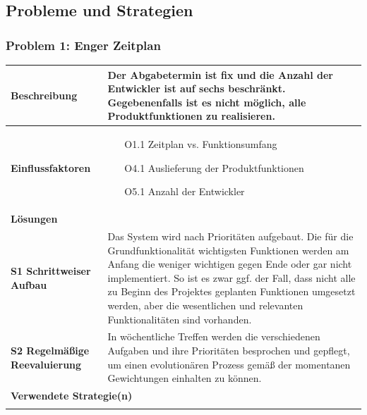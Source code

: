 \documentclass[fontsize=12pt,paper=a4,twoside]{scrartcl}
\begin{document}
\newpage
\subsection{Probleme und Strategien}
\label{sec:strategien}

\subsubsection{Problem 1: Enger Zeitplan}
\begin{tabularx}{\textwidth}{|p{6cm}|X|}
 \hline
 \textbf{Beschreibung} & Der Abgabetermin ist fix und die Anzahl der Entwickler ist auf sechs beschränkt. Gegebenenfalls ist es nicht möglich, alle Produktfunktionen zu realisieren.\\\hline
 \textbf{Einflussfaktoren} &
 \begin{itemize}
 \item[O1.1] Zeitplan vs. Funktionsumfang
 \item[O4.1] Auslieferung der Produktfunktionen
 \item[O5.1] Anzahl der Entwickler
 \end{itemize}\\\hline
\multicolumn{2}{|l|}{\textbf{Lösungen}} \\\hline
\textbf{S1 Schrittweiser Aufbau} & Das System wird nach Prioritäten aufgebaut. Die für die Grundfunktionalität wichtigsten Funktionen werden am Anfang die weniger wichtigen gegen Ende oder gar nicht implementiert. So ist es zwar ggf. der Fall, dass nicht alle zu Beginn des Projektes geplanten Funktionen umgesetzt werden, aber die wesentlichen und relevanten Funktionalitäten sind vorhanden. \\

\textbf{S2 Regelmäßige Reevaluierung} & In wöchentliche Treffen werden die verschiedenen Aufgaben und ihre Prioritäten besprochen und gepflegt, um einen evolutionären Prozess gemäß der momentanen Gewichtungen einhalten zu können. \\\hline
 
\multicolumn{2}{|l|}{\textbf{Verwendete Strategie(n)}} \\\hline
    & \\\hline
\end{tabularx}
\newpage
\end{document}
